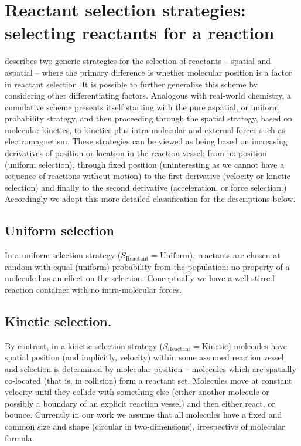 \section{Reactant selection strategies: selecting reactants for a reaction}\label{reactant-selection-strategies}

\autocite{Faulconbridge2011} describes two generic strategies for the
selection of reactants -- spatial and aspatial -- where the primary
difference is whether molecular position is a factor in reactant
selection. It is possible to further generalise this scheme by
considering other differentiating factors. Analogous with real-world
chemistry, a cumulative scheme presents itself starting with the pure
aspatial, or uniform probability strategy, and then proceeding through
the spatial strategy, based on molecular kinetics, to kinetics plus
intra-molecular and external forces such as electromagnetism. These
strategies can be viewed as being based on increasing derivatives of
position or location in the reaction vessel; from no position (uniform
selection), through fixed position (uninteresting as we cannot have a
sequence of reactions without motion) to the first derivative (velocity
or kinetic selection) and finally to the second derivative
(acceleration, or force selection.) Accordingly we adopt this more
detailed classification for the descriptions below.

\subsection{Uniform selection}\label{uniform-selection}

In a uniform selection strategy ($S_\mathrm{Reactant} = \mathrm{Uniform}$), reactants are chosen at random with equal (uniform) probability from the population: no property of a molecule has an effect on the selection. Conceptually we have a well-stirred reaction container with no intra-molecular forces.

\subsection{Kinetic selection.}\label{kinetic-selection.}

By contrast, in a kinetic selection strategy ($S_\mathrm{Reactant} = \mathrm{Kinetic}$) molecules have spatial position (and implicitly, velocity) within some assumed reaction vessel, and selection is determined by molecular position -- molecules which are spatially co-located (that is, in collision) form a reactant set. Molecules move at constant velocity until they collide with something else (either another molecule or possibly a boundary of an explicit reaction vessel) and then either react, or bounce.  Currently in our work we assume that all molecules have a fixed and common size and shape (circular in two-dimensions), irrespective of molecular formula.

